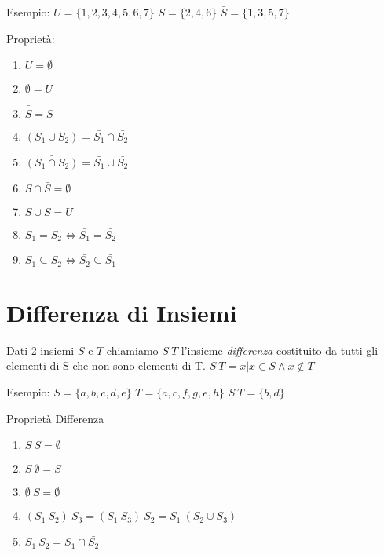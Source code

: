 Esempio: \newline
$U = \{1,2,3,4,5,6,7\} $\newline
$S = \{2,4,6\} $ \newline
$\bar{S} = \{1,3,5,7\} $

\begin{prop}
Proprietà:
\begin{enumerate}
  \item $\bar{U} = \emptyset $
  \item $\bar{\emptyset} = U$
  \item $\bar{\bar{S}} = S$
  \item $\bar{(S_1 \cup S_2)} = \bar{S_1} \cap \bar{S_2}$
  \item $\bar{(S_1 \cap S_2)} = \bar{S_1} \cup \bar{S_2}$
  \item $S \cap \bar{S} = \emptyset$
  \item $S \cup \bar{S} = U$
  \item $S_1 = S_2 \iff \bar{S_1} = \bar{S_2}$
  \item $S_1 \subseteq S_2 \iff \bar{S_2} \subseteq \bar{S_1}$
\end{enumerate}
\end{prop}

\section{Differenza di Insiemi}
Dati 2 insiemi $S$ e $T$ chiamiamo $S \ T$ l'insieme \textit{differenza} costituito
da tutti gli elementi di S che non sono elementi di T. \newline
$S \ T = {x | x \in S \land x \not \in T} $

Esempio: \newline
$S = \{a,b,c,d,e\}$ \quad $T = \{a,c,f,g,e,h\}$\newline
$S \ T = \{b,d\}$

\begin{prop}
Proprietà Differenza
\begin{enumerate}
  \item $S \ S = \emptyset$
  \item $S \ \emptyset = S$
  \item $\emptyset \ S = \emptyset$
  \item $(S_1 \ S_2) \ S_3 = (S_1 \ S_3) \ S_2 = S_1 \ (S_2 \cup S_3)$
  \item $S_1 \ S_2 = S_1 \cap \bar{S_2}$
\end{enumerate}
\end{prop}

